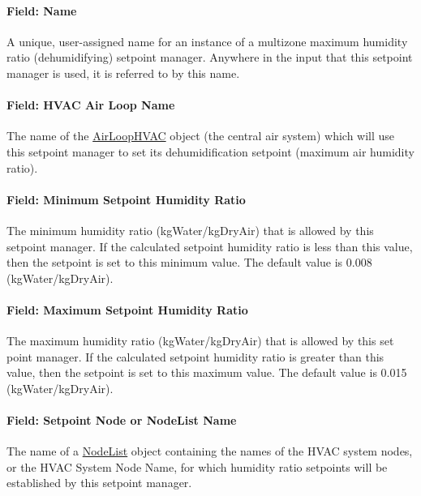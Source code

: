 \paragraph{Field: Name}\label{field-name-19-003}

A unique, user-assigned name for an instance of a multizone maximum humidity ratio (dehumidifying) setpoint manager. Anywhere in the input that this setpoint manager is used, it is referred to by this name.

\paragraph{Field: HVAC Air Loop Name}\label{field-hvac-air-loop-name-9}

The name of the \hyperref[airloophvac]{AirLoopHVAC} object (the central air system) which will use this setpoint manager to set its dehumidification setpoint (maximum air humidity ratio).

\paragraph{Field: Minimum Setpoint Humidity Ratio}\label{field-minimum-setpoint-humidity-ratio-4}

The minimum humidity ratio (kgWater/kgDryAir) that is allowed by this setpoint manager. If the calculated setpoint humidity ratio is less than this value, then the setpoint is set to this minimum value. The default value is 0.008 (kgWater/kgDryAir).

\paragraph{Field: Maximum Setpoint Humidity Ratio}\label{field-maximum-setpoint-humidity-ratio-4}

The maximum humidity ratio (kgWater/kgDryAir) that is allowed by this set point manager. If the calculated setpoint humidity ratio is greater than this value, then the setpoint is set to this maximum value. The default value is 0.015 (kgWater/kgDryAir).

\paragraph{Field: Setpoint Node or NodeList Name}\label{field-setpoint-node-or-nodelist-name-18}

The name of a \hyperref[nodelist]{NodeList} object containing the names of the HVAC system nodes, or the HVAC System Node Name, for which humidity ratio setpoints will be established by this setpoint manager.


